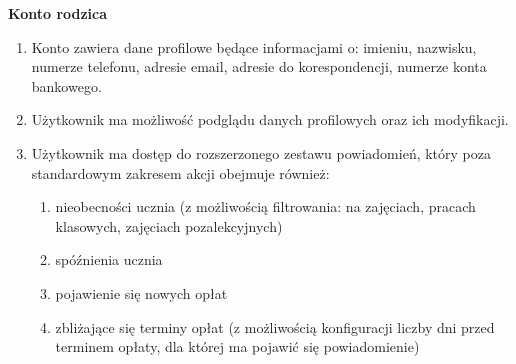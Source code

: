 \documentclass{article}
\begin{document}
\textbf{Konto rodzica}
\begin{enumerate}
	\item Konto zawiera dane profilowe będące informacjami o: imieniu, nazwisku, numerze telefonu, adresie email, adresie do korespondencji, numerze konta bankowego.
	\item Użytkownik ma możliwość podglądu danych profilowych oraz ich modyfikacji.
	\item Użytkownik ma dostęp do rozszerzonego zestawu powiadomień, który poza standardowym zakresem akcji obejmuje również:
	\begin{enumerate}
		\item nieobecności ucznia (z możliwością filtrowania: na zajęciach, pracach klasowych, zajęciach pozalekcyjnych)
		\item spóźnienia ucznia
		\item pojawienie się nowych opłat
		\item zbliżające się terminy opłat (z możliwością konfiguracji liczby dni przed terminem opłaty, dla której ma pojawić się powiadomienie)
	\end{enumerate}


\end{enumerate}
\end{document}
